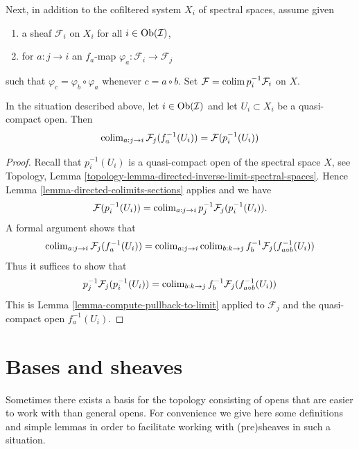 \noindent
Next, in addition to the cofiltered system $X_i$ of spectral spaces,
assume given
\begin{enumerate}
\item a sheaf $\mathcal{F}_i$ on $X_i$ for all $i \in \mathop{\mathrm{Ob}}\nolimits(\mathcal{I})$,
\item for $a : j \to i$ an $f_a$-map
$\varphi_a : \mathcal{F}_i \to \mathcal{F}_j$
\end{enumerate}
such that $\varphi_c = \varphi_b \circ \varphi_a$
whenever $c = a \circ b$. Set $\mathcal{F} = \mathop{\mathrm{colim}}\nolimits p_i^{-1}\mathcal{F}_i$
on $X$.

\begin{lemma}
\label{lemma-descend-opens}
In the situation described above, let $i \in \mathop{\mathrm{Ob}}\nolimits(\mathcal{I})$ and let
$U_i \subset X_i$ be a quasi-compact open. Then
$$
\mathop{\mathrm{colim}}\nolimits_{a : j \to i} \mathcal{F}_j(f_a^{-1}(U_i)) = \mathcal{F}(p_i^{-1}(U_i))
$$
\end{lemma}

\begin{proof}
Recall that $p_i^{-1}(U_i)$ is a quasi-compact open of the spectral space
$X$, see
Topology, Lemma \ref{topology-lemma-directed-inverse-limit-spectral-spaces}.
Hence Lemma \ref{lemma-directed-colimits-sections} applies and we have
$$
\mathcal{F}(p_i^{-1}(U_i)) =
\mathop{\mathrm{colim}}\nolimits_{a : j \to i} p_j^{-1}\mathcal{F}_j(p_i^{-1}(U_i)).
$$
A formal argument shows that
$$
\mathop{\mathrm{colim}}\nolimits_{a : j \to i} \mathcal{F}_j(f_a^{-1}(U_i)) =
\mathop{\mathrm{colim}}\nolimits_{a : j \to i} \mathop{\mathrm{colim}}\nolimits_{b : k \to j}
f_b^{-1}\mathcal{F}_j(f_{a \circ b}^{-1}(U_i))
$$
Thus it suffices to show that
$$
p_j^{-1}\mathcal{F}_j(p_i^{-1}(U_i)) =
\mathop{\mathrm{colim}}\nolimits_{b : k \to j} f_b^{-1}\mathcal{F}_j(f_{a \circ b}^{-1}(U_i))
$$
This is Lemma \ref{lemma-compute-pullback-to-limit}
applied to $\mathcal{F}_j$ and the quasi-compact open $f_a^{-1}(U_i)$.
\end{proof}

















\section{Bases and sheaves}
\label{section-bases}

\noindent
Sometimes there exists a basis for the topology
consisting of opens that are easier to work with
than general opens. For convenience we give here
some definitions and simple lemmas in order to
facilitate working with (pre)sheaves in such a situation.

